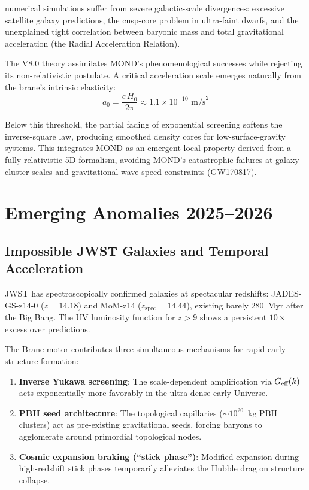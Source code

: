 \LCDM{} numerical simulations suffer from severe galactic-scale divergences: excessive satellite galaxy predictions, the cusp-core problem in ultra-faint dwarfs, and the unexplained tight correlation between baryonic mass and total gravitational acceleration (the Radial Acceleration Relation).

The V8.0 theory assimilates MOND's phenomenological successes while rejecting its non-relativistic postulate. A critical acceleration scale emerges naturally from the brane's intrinsic elasticity:
\begin{equation}
a_0 = \frac{c\,H_0}{2\pi} \approx 1.1 \times 10^{-10}\text{ m/s}^2
\end{equation}

Below this threshold, the partial fading of exponential screening softens the inverse-square law, producing smoothed density cores for low-surface-gravity systems. This integrates MOND as an emergent local property derived from a fully relativistic 5D formalism, avoiding MOND's catastrophic failures at galaxy cluster scales and gravitational wave speed constraints (GW170817).

\section{Emerging Anomalies 2025--2026}
\label{sec:emerging_anomalies}

\subsection{Impossible JWST Galaxies and Temporal Acceleration}
\label{sec:jwst_galaxies}

JWST has spectroscopically confirmed galaxies at spectacular redshifts: JADES-GS-z14-0 ($z = 14.18$) and MoM-z14 ($z_\text{spec} = 14.44$), existing barely 280~Myr after the Big Bang. The UV luminosity function for $z > 9$ shows a persistent $10\times$ excess over \LCDM{} predictions.

The Brane motor contributes three simultaneous mechanisms for rapid early structure formation:

\begin{enumerate}
  \item \textbf{Inverse Yukawa screening}: The scale-dependent amplification via $G_\text{eff}(k)$ acts exponentially more favorably in the ultra-dense early Universe.
  \item \textbf{PBH seed architecture}: The topological capillaries ($\sim 10^{20}$~kg PBH clusters) act as pre-existing gravitational seeds, forcing baryons to agglomerate around primordial topological nodes.
  \item \textbf{Cosmic expansion braking (``stick phase'')}: Modified expansion during high-redshift stick phases temporarily alleviates the Hubble drag on structure collapse.
\end{enumerate}

